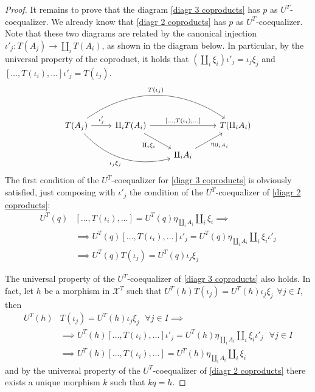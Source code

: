 \begin{subbox}{}
\begin{proof}
It remains to prove that the diagram \eqref{diagr 3 coproducts} has $p$ as $U^T$-coequalizer. We already know that \eqref{diagr 2 coproducts} has $p$ as $U^T$-coequalizer. Note that these two diagrams are related by the canonical injection $\iota'_j:T(A_j) \to \amalg_iT(A_i)$, as shown in the diagram below. In particular, by the universal property of the coproduct, it holds that $(\amalg_i \xi_i) \iota'_j = \iota_j\xi_j$ and $[\ldots,T(\iota_i),\ldots] \iota'_j = T(\iota_j)$.
\[
\begin{tikzcd}
T(A_j) \arrow[r, "\iota'_j"] \arrow[rrr, "T(\iota_j)", bend left=35] \arrow[rrd, "\iota_j\xi_j"', bend right] & \amalg_iT(A_i) \arrow[rr, "{[\ldots,T(\iota_i),\ldots]}"] \arrow[rd, "\amalg_i \xi_i"'] &                                           & T(\amalg_iA_i) \\
                                                                                                              &                                                                                     & \amalg_iA_i \arrow[ru, "\eta_{\amalg_iA_i}"'] &             
\end{tikzcd}
\]
The first condition of the $U^T$-coequalizer for \eqref{diagr 3 coproducts} is obviously satisfied, just composing with $\iota'_j$ the condition of the $U^T$-coequalizer of \eqref{diagr 2 coproducts}:
\begin{align*}
    U^T(q) &[\ldots,T(\iota_i),\ldots] = U^T(q) \eta_{\amalg_iA_i} \amalg_i \xi_i \implies \\[1.5ex]
    &\implies U^T(q) [\ldots,T(\iota_i),\ldots] \iota'_j= U^T(q) \eta_{\amalg_iA_i} \amalg_i \xi_i \iota'_j \\[1.5ex]
    &\implies U^T(q) T(\iota_j) = U^T(q) \iota_j \xi_j 
\end{align*}

The universal property of the $U^T$-coequalizer of \eqref{diagr 3 coproducts} also holds. In fact, let $h$ be a morphism in $\mathcal{X}^T$ such that $U^T(h) T(\iota_j) = U^T(h) \iota_j \xi_j \ \ \forall j \in I$, then 
\begin{align*}
    U^T(h) &T(\iota_j) = U^T(h) \iota_j \xi_j \ \ \ \forall j \in I \implies \\[1.5ex]
    &\implies U^T(h) [\ldots,T(\iota_i),\ldots] \iota'_j= U^T(h) \eta_{\amalg_iA_i} \amalg_i \xi_i \iota'_j \ \ \ \forall j \in I \\[1.5ex]
    &\implies U^T(h) [\ldots,T(\iota_i),\ldots] = U^T(h) \eta_{\amalg_iA_i} \amalg_i \xi_i
\end{align*}
and by the universal property of the $U^T$-coequalizer of \eqref{diagr 2 coproducts} there exists a unique morphism $k$ such that $kq=h$.
\end{proof}
\end{subbox}


